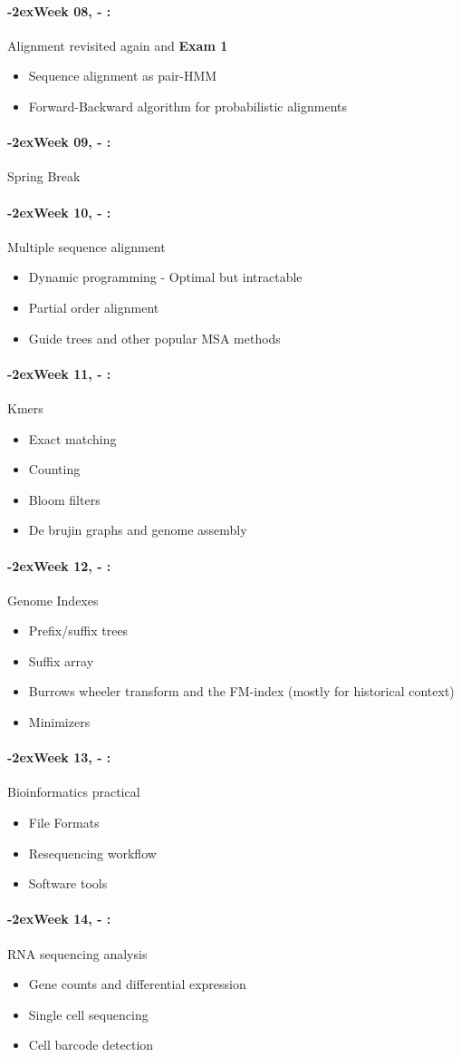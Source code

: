 \documentclass[11pt]{article}
\newcommand{\week}[1]{%
  \paragraph*{\kern-2ex\quad #1, \syldate{\today} - \AdvanceDate[4]\syldate{\today}:}%
  \ifdim\wd1=\wd\MONDAY
    \AdvanceDate[7]
  \else
    \AdvanceDate[7]
  \fi%
}
\begin{document}
\week{Week 08} Alignment revisited again and \textbf{Exam 1}
\begin{itemize}
\item Sequence alignment as pair-HMM
\item Forward-Backward algorithm for probabilistic alignments
\end{itemize}

\week{Week 09} Spring Break

\week{Week 10} Multiple sequence alignment
\begin{itemize}
\item Dynamic programming - Optimal but intractable
\item Partial order alignment
\item Guide trees and other popular MSA methods
\end{itemize}

\week{Week 11} Kmers
\begin{itemize}
\item Exact matching
\item Counting
\item Bloom filters
\item De brujin graphs and genome assembly
\end{itemize}

\week{Week 12} Genome Indexes
\begin{itemize}
\item Prefix/suffix trees
\item Suffix array
\item Burrows wheeler transform and the FM-index (mostly for historical context)
\item Minimizers
\end{itemize}

\week{Week 13} Bioinformatics practical
\begin{itemize}
\item File Formats
\item Resequencing workflow
\item Software tools
\end{itemize}

\week{Week 14} RNA sequencing analysis
\begin{itemize}
\item Gene counts and differential expression
\item Single cell sequencing
\item Cell barcode detection
\end{itemize}
\end{document}
